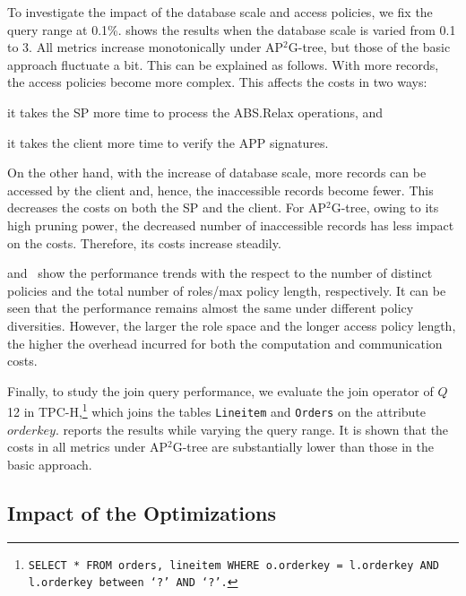 To investigate the impact of the database scale and access policies, we fix the query range at 0.1\%.  shows the results when the database scale is varied from 0.1 to 3. All metrics increase monotonically under AP$^2$G-tree, but those of the basic approach fluctuate a bit. This can be explained as follows. With more records, the access policies become more complex. This affects the costs in two ways:
\begin{inlineenum}
    \item it takes the SP more time to process the \textsf{ABS.Relax} operations, and
    \item it takes the client more time to verify the APP signatures.
\end{inlineenum}
On the other hand, with the increase of database scale, more records can be accessed by the client and, hence, the inaccessible records become fewer. This decreases the costs on both the SP and the client.
For AP$^2$G-tree, owing to its high pruning power, the decreased number of inaccessible records has less impact on the costs. Therefore, its costs increase steadily.

 and~ show the performance trends with the respect to the number of distinct policies and the total number of roles/max policy length, respectively. It can be seen that the performance remains almost the same under different policy diversities. However, the larger the role space and the longer access policy length, the higher the overhead incurred for both the computation and communication costs.

Finally, to study the join query performance, we evaluate the join operator of $Q$12 in TPC-H,\footnote{\texttt{SELECT * FROM orders, lineitem WHERE o.orderkey = l.orderkey AND l.orderkey between `?' AND `?'.}} which joins the tables \texttt{Lineitem} and \texttt{Orders} on the attribute $orderkey$.  reports the results while varying the query range. It is shown that the costs in all metrics under AP$^2$G-tree are substantially lower than those in the basic approach.

\subsection{Impact of the Optimizations}

